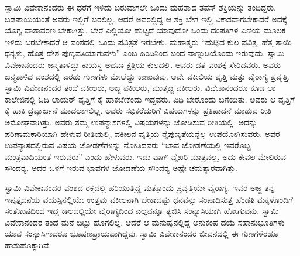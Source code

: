 ಸ್ವಾಮಿ ವಿವೇಕಾನಂದರು ಈ ಧರೆಗೆ ಇಳಿದು ಬರುವಾಗಲೇ ಒಂದು ಮಹತ್ತಾದ ತಪಸ್ ಶಕ್ತಿಯನ್ನು ತಂದಿದ್ದರು. ಬಡಪಾಯಿಯಂತೆ ಅವರು ಇಲ್ಲಿಗೆ ಬರಲಿಲ್ಲ. ಆದರೆ ಅವರಲ್ಲಿದ್ದ ಆ ಶಕ್ತಿ ಬೇಗ ಇಲ್ಲಿ ವಿಕಾಸವಾಗಬೇಕಾದರೆ ಅದಕ್ಕೆ ಯೊಗ್ಯ ವಾತಾವರಣ ಬೇಕಾಗಿತ್ತು. ಬೇರೆ ಎಲ್ಲಿಯೋ ಹುಟ್ಟದೆ ಯಾವುದೋ ಒಂದು ದಂಪತಿಗಳ ಏಣಿಯ ಮೂಲಕ ಇಳಿದು ಬರಬೇಕಾದರೆ ಆ ವಂಶದಲ್ಲಿ ಒಂದು ಪವಿತ್ರತೆ ಇರಬೇಕು. ಮಹಾತ್ಮರು “ಹುಟ್ಟಿದ ಕುಲ ಪವಿತ್ರ, ಹೆತ್ತ ತಾಯಿ ಧನ್ಯಳು, ಹೊತ್ತ ದೇಶ ಪುಣ್ಯವತಿಯಾಗುವಳು” ಎಂಬ ಹಿಂದಿನಿಂದ ಬಂದ ನಾಣ್ನುಡಿಯೊಂದು ಇರುವುದು. ಸ್ವಾಮಿ ವಿವೇಕಾನಂದರು ಜನ್ಮತಾಳಿದ್ದು ಕಾಯಸ್ಥ ಅಥವಾ ಕ್ಷತ್ರಿಯ ಕುಲದಲ್ಲಿ. ಅವರು ದತ್ತ ವಂಶಕ್ಕೆ ಸೇರಿದವರು. ಅವರು ಜನ್ಮತಾಳಿದ ವಂಶದಲ್ಲಿ ಎರಡು ಗುಣಗಳು ಮೇಲೆದ್ದು ಕಾಣುವುವು. ಅವೇ ವಕೀಲಿಯ ವೃತ್ತಿ ಮತ್ತು ವೈರಾಗ್ಯ ಪ್ರವೃತ್ತಿ. ಸ್ವಾಮಿ ವಿವೇಕಾನಂದರ ತಂದೆ ವಕೀಲರು, ಅಜ್ಜ ವಕೀಲರು, ಮುತ್ತಜ್ಜ ವಕೀಲರು. ವಿವೇಕಾನಂದರೂ ಕೂಡ ಲಾ ಕಾಲೇಜಿನಲ್ಲಿ ಓದಿ ಲಾಯರ್ ವೃತ್ತಿಗೆ ಕೈ ಹಾಕಬೇಕೆಂದು ಇದ್ದವರು. ವಿಧಿ ಬೇರೊಂದು ಬಗೆಯಿತು. ಅವರು ಆ ವೃತ್ತಿಗೆ ಕೈ ಹಾಕಿ ದ್ರವ್ಯಾರ್ಜನೆ ಮಾಡಲಾಗಲಿಲ್ಲ. ಅವರು ಸಭಿಕರೆದುರಿಗೆ ವಿಷಯಗಳನ್ನು ಪ್ರತಿಪಾದನೆ ಮಾಡುವ ರೀತಿ ಅಮೋಘವಾಗಿತ್ತು. ಅವರು ತಮ್ಮ ಉಪನ್ಯಾಸಗಳಲ್ಲಿ ವಿಷಯಗಳನ್ನು ಜೋಡಿಸುವ ರೀತಿಯಲ್ಲಿ, ಅದನ್ನು ಪರಿಣಾಮಕಾರಿಯಾಗಿ ಹೇಳುವ ರೀತಿಯಲ್ಲಿ, ವಕೀಲನ ವೃತ್ತಿಯ ನೈಪುಣ್ಯತೆಯನ್ನೆಲ್ಲ ಉಪಯೋಗಿಸುವರು. ಅವರ ಉಪನ್ಯಾಸದಲ್ಲಿರುವ ವಿಷಯ ಜೋಡಣೆಗಳನ್ನು ನೋಡಿದವರು “ಭಾವ ಜೋಡಣೆಯಲ್ಲಿ ಇವರೊಬ್ಬ ಮಂತ್ರವಾದಿಯಂತೆ ಇರುವರು” ಎಂದು ಹೇಳುವರು. ಇದು ವಾಗ್ ವೈಖರಿ ಮಾತ್ರವಲ್ಲ, ಅದು ಕೇವಲ ಮೇಲಿರುವ ಸೌಂದರ‍್ಯ. ಅದರ ಒಳಗೆ ಇರುವ ಭಾವಗಳ ಜೋಡಣೆಯ ಸೌಂದರ‍್ಯ ಅಷ್ಟೇ ಚಮತ್ಕಾರವಾಗಿತ್ತು.

ಸ್ವಾಮಿ ವಿವೇಕಾನಂದರ ವಂಶದ ರಕ್ತದಲ್ಲಿ ಹರಿಯುತ್ತಿದ್ದ ಮತ್ತೊಂದು ಪ್ರವೃತ್ತಿಯೇ ವೈರಾಗ್ಯ. ಇವರ ಅಜ್ಜ ತನ್ನ ಇಪ್ಪತ್ತೈದನೆಯ ವಯಸ್ಸಿನಲ್ಲಿಯೇ ಉತ್ತಮ ವಕೀಲನಾಗಿ ಬೇಕಾದಷ್ಟು ಧನವನ್ನು ಸಂಪಾದಿಸುತ್ತ ಹೆಂಡತಿ ಮಕ್ಕಳೊಂದಿಗೆ ಸಂತೋಷದಿಂದ ಇದ್ದ ಕಾಲದಲ್ಲಿಯೇ ವೈರಾಗ್ಯದಿಂದ ಎಲ್ಲವನ್ನೂ ತ್ಯಜಿಸಿ ಸಂನ್ಯಾಸಿಯಾಗಿ ಹೋಗುವನು. ಸ್ವಾಮಿ ವಿವೇಕಾನಂದರ ತಂದೆ ಮನೆ ಬಿಟ್ಟು ಹೊಗಲಿಲ್ಲ. ಆದರೆ ಆ ಮನುಷ್ಯನಲ್ಲಿದ್ದ ಅನುಕಂಪ ದಯೆ ಸಹಾನುಭೂತಿಗಳು ಯಾವ ಸಂನ್ಯಾಸಿಗಾದರೂ ಭೂಷಣಪ್ರಾಯವಾಗಿದ್ದವು. ಸ್ವಾಮಿ ವಿವೇಕಾನಂದರ ಜೀವನದಲ್ಲಿ ಈ ಗುಣಗಳೆರಡೂ ಹಾಸುಹೊಕ್ಕಾಗಿವೆ.

\vskip 2pt

